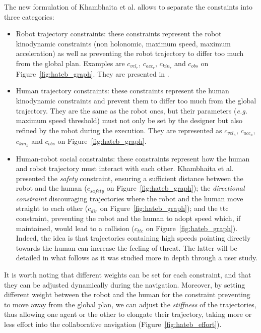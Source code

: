 \documentclass[a4paper,11pt,twoside]{StyleThese}
\begin{document}
The new formulation of Khambhaita et al. allows to separate the constaints into three categories:
\begin{itemize}
\item Robot trajectory constraints: these constraints represent the robot kinodynamic constraints (non holonomic, maximum speed, maximum acceleration) as well as preventing the robot trajectory to differ too much from the global plan. Examples are $c_{vel_{r}}$,  $c_{acc_{r}}$, $c_{kin_{r}}$ and $c_{obs}$ on Figure~\ref{fig:hateb_graph}. They are presented in \cite{rosmann_efficient_2013}.
\item Human trajectory constraints: these constraints represent the human kinodynamic constraints and prevent them to differ too much from the global trajectory. They are the same as the robot ones, but their parameters (\textit{e.g.} maximum speed threshold) must not only be set by the designer but also refined by the robot during the execution. They are represented as $c_{vel_{h}}$,  $c_{acc_{h}}$, $c_{kin_{h}}$ and $c_{obs}$ on Figure~\ref{fig:hateb_graph}.
\item Human-robot social constraints: these constraints represent how the human and robot trajectory must interact with each other. Khambhaita et al. presented the \textit{safety} constraint, ensuring a sufficient distance between the robot and the human ($c_{safety}$ on Figure~\ref{fig:hateb_graph}); the \textit{directional constraint} discouraging trajectories where the robot and the human move straight to each other ($c_{dir}$ on Figure~\ref{fig:hateb_graph}); and the \acrfull{ttc} constraint, preventing the robot and the human to adopt speed which, if maintained, would lead to a collision ($c_{ttc}$ on Figure~\ref{fig:hateb_graph}). Indeed, the idea is that trajectories containing high speeds pointing directly towards the human can increase the feeling of threat. The latter will be detailed in what follows as it was studied more in depth through a user study.
\end{itemize}

It is worth noting that different weights can be set for each constraint, and that they can be adjusted dynamically during the navigation. Moreover, by setting different weight between the robot and the human for the constraint preventing to move away from the global plan, we can adjust the \textit{stiffness} of the trajectories, thus allowing one agent or the other to elongate their trajectory, taking more or less effort into the collaborative navigation (Figure~\ref{fig:hateb_effort}).
\end{document}
